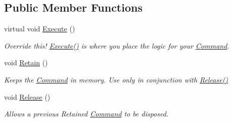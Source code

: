 \subsection*{Public Member Functions}
\begin{DoxyCompactItemize}
\item 
\hypertarget{classstrange_1_1extensions_1_1command_1_1impl_1_1_command_a4a1155270428842c342482c6885b2652}{virtual void \hyperlink{classstrange_1_1extensions_1_1command_1_1impl_1_1_command_a4a1155270428842c342482c6885b2652}{Execute} ()}\label{classstrange_1_1extensions_1_1command_1_1impl_1_1_command_a4a1155270428842c342482c6885b2652}

\begin{DoxyCompactList}\small\item\em Override this! {\ttfamily \hyperlink{classstrange_1_1extensions_1_1command_1_1impl_1_1_command_a4a1155270428842c342482c6885b2652}{Execute()}} is where you place the logic for your \hyperlink{classstrange_1_1extensions_1_1command_1_1impl_1_1_command}{Command}. \end{DoxyCompactList}\item 
\hypertarget{classstrange_1_1extensions_1_1command_1_1impl_1_1_command_a1525def9650d4b6ed6ed6cef2936d892}{void \hyperlink{classstrange_1_1extensions_1_1command_1_1impl_1_1_command_a1525def9650d4b6ed6ed6cef2936d892}{Retain} ()}\label{classstrange_1_1extensions_1_1command_1_1impl_1_1_command_a1525def9650d4b6ed6ed6cef2936d892}

\begin{DoxyCompactList}\small\item\em Keeps the \hyperlink{classstrange_1_1extensions_1_1command_1_1impl_1_1_command}{Command} in memory. Use only in conjunction with {\ttfamily \hyperlink{classstrange_1_1extensions_1_1command_1_1impl_1_1_command_a783b532e62f1c5c7789ae1a5791c75c7}{Release()}} \end{DoxyCompactList}\item 
\hypertarget{classstrange_1_1extensions_1_1command_1_1impl_1_1_command_a783b532e62f1c5c7789ae1a5791c75c7}{void \hyperlink{classstrange_1_1extensions_1_1command_1_1impl_1_1_command_a783b532e62f1c5c7789ae1a5791c75c7}{Release} ()}\label{classstrange_1_1extensions_1_1command_1_1impl_1_1_command_a783b532e62f1c5c7789ae1a5791c75c7}

\begin{DoxyCompactList}\small\item\em Allows a previous Retained \hyperlink{classstrange_1_1extensions_1_1command_1_1impl_1_1_command}{Command} to be disposed. \end{DoxyCompactList}\end{DoxyCompactItemize}

